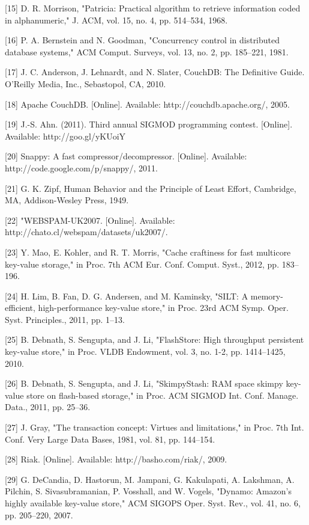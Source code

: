 [15] D. R. Morrison, "Patricia: Practical algorithm to retrieve information coded in alphanumeric," J. ACM, vol. 15, no. 4, pp. 514–534, 1968.

[16] P. A. Bernstein and N. Goodman, "Concurrency control in distributed database systems," ACM Comput. Surveys, vol. 13, no. 2, pp. 185–221, 1981.

[17] J. C. Anderson, J. Lehnardt, and N. Slater, CouchDB: The Definitive Guide. O’Reilly Media, Inc., Sebastopol, CA, 2010.

[18] Apache CouchDB. [Online]. Available: http://couchdb.apache.org/, 2005.

[19] J.-S. Ahn. (2011). Third annual SIGMOD programming contest. [Online]. Available: http://goo.gl/yKUoiY

[20] Snappy: A fast compressor/decompressor. [Online]. Available: http://code.google.com/p/snappy/, 2011.

[21] G. K. Zipf, Human Behavior and the Principle of Least Effort, Cambridge, MA, Addison-Wesley Press, 1949.

[22] "WEBSPAM-UK2007. [Online]. Available: http://chato.cl/webspam/datasets/uk2007/.

[23] Y. Mao, E. Kohler, and R. T. Morris, "Cache craftiness for fast multicore key-value storage," in Proc. 7th ACM Eur. Conf. Comput. Syst., 2012, pp. 183–196.

[24] H. Lim, B. Fan, D. G. Andersen, and M. Kaminsky, "SILT: A memory-efficient, high-performance key-value store," in Proc. 23rd ACM Symp. Oper. Syst. Principles., 2011, pp. 1–13.

[25] B. Debnath, S. Sengupta, and J. Li, "FlashStore: High throughput persistent key-value store," in Proc. VLDB Endowment, vol. 3, no. 1-2, pp. 1414–1425, 2010.

[26] B. Debnath, S. Sengupta, and J. Li, "SkimpyStash: RAM space skimpy key-value store on flash-based storage," in Proc. ACM SIGMOD Int. Conf. Manage. Data., 2011, pp. 25–36.

[27] J. Gray, "The transaction concept: Virtues and limitations," in Proc. 7th Int. Conf. Very Large Data Bases, 1981, vol. 81, pp. 144–154.

[28] Riak. [Online]. Available: http://basho.com/riak/, 2009.

[29] G. DeCandia, D. Hastorun, M. Jampani, G. Kakulapati, A. Lakshman, A. Pilchin, S. Sivasubramanian, P. Vosshall, and W. Vogels, "Dynamo: Amazon’s highly available key-value store," ACM SIGOPS Oper. Syst. Rev., vol. 41, no. 6, pp. 205–220, 2007.

